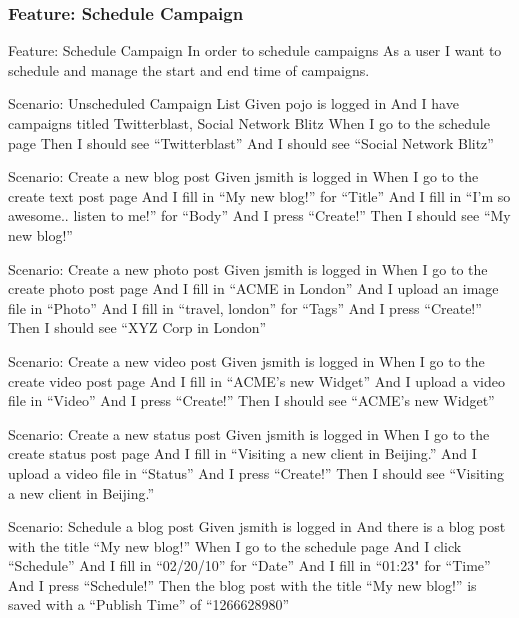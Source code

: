 \documentclass[12pt]{article}
\begin{document}
\subsubsection{Feature: Schedule Campaign}

\begin{hangparas}{0.25in}{1}
Feature: Schedule Campaign 
In order to schedule campaigns 
As a user 
I want to schedule and manage the start and end time of campaigns. 

Scenario: Unscheduled Campaign List 
  Given pojo is logged in 
  And I have campaigns titled Twitterblast, Social Network Blitz 
  When I go to the schedule page 
  Then I should see ``Twitterblast'' 
  And I should see ``Social Network Blitz'' 
  
Scenario: Create a new blog post 
  Given jsmith is logged in 
  When I go to the create text post page 
  And I fill in ``My new blog!'' for ``Title''
  And I fill in ``I'm so awesome.. listen to me!'' for ``Body'' 
  And I press ``Create!'' 
  Then I should see ``My new blog!'' 
  
Scenario: Create a new photo post 
  Given jsmith is logged in 
  When I go to the create photo post page 
  And I fill in ``ACME in London'' 
  And I upload an image file in ``Photo'' 
  And I fill in ``travel, london'' for ``Tags'' 
  And I press ``Create!'' 
  Then I should see ``XYZ Corp in London'' 
  
  Scenario: Create a new video post 
    Given jsmith is logged in 
    When I go to the create video post page 
    And I fill in ``ACME's new Widget'' 
    And I upload a video file in ``Video'' 
    And I press ``Create!'' 
    Then I should see ``ACME's new Widget'' 
  
  Scenario: Create a new status post 
    Given jsmith is logged in 
    When I go to the create status post page 
    And I fill in ``Visiting a new client in Beijing.'' 
    And I upload a video file in ``Status'' 
    And I press ``Create!'' 
    Then I should see ``Visiting a new client in Beijing.'' 

  Scenario: Schedule a blog post 
    Given jsmith is logged in 
    And there is a blog post with the title ``My new blog!'' 
    When I go to the schedule page 
    And I click ``Schedule'' 
    And I fill in ``02/20/10'' for ``Date''
    And I fill in ``01:23" for ``Time''
    And I press ``Schedule!'' 
    Then the blog post with the title ``My new blog!'' is saved with a ``Publish Time'' of ``1266628980'' 
\end{hangparas}
\end{document}
